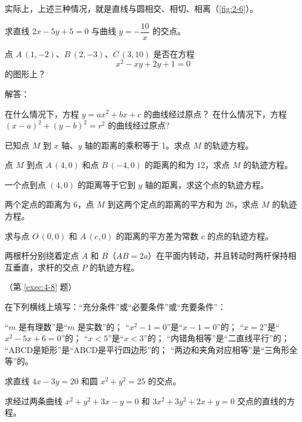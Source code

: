 实际上，上述三种情况，就是直线与圆相交、相切、相离（\cref{fig:2-6}）。

\begin{Practice}
  求直线 $2x-5y+5=0$ 与曲线 $y=-\dfrac{10}{x}$ 的交点。
\end{Practice}

\begin{Exercise}
  \begin{question}
    \item 点 $A\,(1,-2)$、$B\,(2,-3)$、$C\,(3,10)$ 是否在方程
    \[ x^2-xy+2y+1=0\]
    的图形上？
    \item 解答：
    \begin{tasks}
      \task 在什么情况下，方程 $y=ax^2+bx+c$ 的曲线经过原点？
      \task 在什么情况下，方程 $(x-a)^2+(y-b)^2=r^2$ 的曲线经过原点?
    \end{tasks}
    \item 已知点 $M$ 到 $x$ 轴、$y$ 轴的距离的乘积等于 1。求点 $M$ 的轨迹方程。
    \item 点 $M$ 到点 $A\,(4,0)$ 和点 $B\,(-4,0)$ 的距离的和为 12，求点 $M$ 的轨迹方程。
    \item 一个点到点 $(4,0)$ 的距离等于它到 $y$ 轴的距离，求这个点的轨迹方程。
    \item 两个定点的距离为 6，点 $M$ 到这两个定点的距离的平方和为 26，求点 $M$ 的轨迹方程。
    \item 求与点 $O\,(0,0)$ 和 $A\,(c,0)$ 的距离的平方差为常数 $c$ 的点的轨迹方程。
    \item \label{exec:4-8}两根杆分别绕着定点 $A$ 和 $B$（$AB=2a$）在平面内转动，并且转动时两杆保持相互垂直，求杆的交点 $P$ 的轨迹方程。
    \begin{figurehere}
      \begin{minipage}{\linewidth}\centering
        \caption*{（第 \ref{exec:4-8} 题）}
      \end{minipage}
    \end{figurehere}
    \item 在下列横线上填写：“充分条件”或“必要条件”或“充要条件”：
    \begin{tasks}
      \task “$m$ 是有理数”是“$m$ 是实数”的；
      \task “$x^2-1=0$”是“$x-1=0$”的；
      \task “$x=2$”是“$x^2-5x+6=0$”的；
      \task “$x<5$”是“$x<3$”的；
      \task “内错角相等”是“二直线平行”的；
      \task “ABCD是矩形”是“ABCD是平行四边形”的；
      \task “两边和夹角对应相等”是“三角形全等”的。
    \end{tasks}
    \item 求直线 $4x-3y=20$ 和圆 $x^2+y^2=25$ 的交点。
    \item 求经过两条曲线 $x^2+y^2+3x-y=0$ 和 $3x^2+3y^2+2x+y=0$ 交点的直线的方程。
  \end{question}
\end{Exercise}

